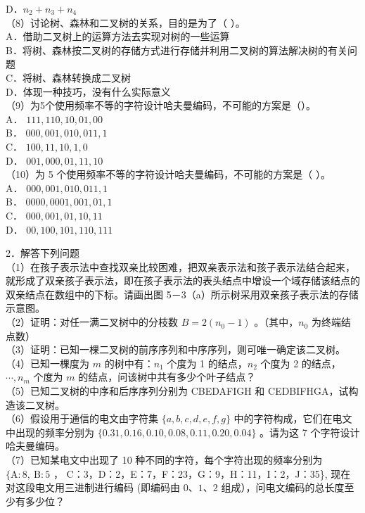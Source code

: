 \documentclass[10pt]{article}
\begin{document}
D．$n_{2}+n_{3}+n_{4}$\\
（8）讨论树、森林和二叉树的关系，目的是为了（ ）。\\
A．借助二叉树上的运算方法去实现对树的一些运算\\
B．将树、森林按二叉树的存储方式进行存储并利用二叉树的算法解决树的有关问题\\
C．将树、森林转换成二叉树\\
D．体现一种技巧，没有什么实际意义\\
（9）为5个使用频率不等的字符设计哈夫曼编码，不可能的方案是（）。\\
A． $111,110,10,01,00$\\
B． $000,001,010,011,1$\\
C． $100,11,10,1,0$\\
D． $001,000,01,11,10$\\
（10）为 5 个使用频率不等的字符设计哈夫曼编码，不可能的方案是（ ）。\\
A． $000,001,010,011,1$\\
B． $0000,0001,001,01,1$\\
C． $000,001,01,10,11$\\
D． $00,100,101,110,111$

2．解答下列问题\\
（1）在孩子表示法中查找双亲比较困难，把双亲表示法和孩子表示法结合起来，就形成了双亲孩子表示法，即在孩子表示法的表头结点中增设一个域存储该结点的双亲结点在数组中的下标。请画出图 5－3（a）所示树采用双亲孩子表示法的存储示意图。\\
（2）证明：对任一满二叉树中的分枝数 $B=2\left(n_{0}-1\right)$ 。（其中，$n_{0}$ 为终端结点数）\\
（3）证明：已知一棵二叉树的前序序列和中序序列，则可唯一确定该二叉树。\\
（4）已知一棵度为 $m$ 的树中有：$n_{1}$ 个度为 1 的结点，$n_{2}$ 个度为 2 的结点，$\cdots, n_{m}$ 个度为 $m$ 的结点，问该树中共有多少个叶子结点？\\
（5）已知二叉树的中序和后序序列分别为 CBEDAFIGH 和 CEDBIFHGA，试构造该二叉树。\\
（6）假设用于通信的电文由字符集 $\{a, b, c, d, e, f, g\}$ 中的字符构成，它们在电文中出现的频率分别为 $\{0.31,0.16,0.10,0.08,0.11,0.20,0.04\}$ 。请为这 7 个字符设计哈夫曼编码。\\
（7）已知某电文中出现了 10 种不同的字符，每个字符出现的频率分别为 $\{\mathrm{A}: 8, \mathrm{~B}: 5$ ， C：3，D：2，E：7，F：23，G：9，H：11，I：2，J：35\}, 现在对这段电文用三进制进行编码 (即编码由 $0 、 1 、 2$ 组成），问电文编码的总长度至少有多少位？
\end{document}

